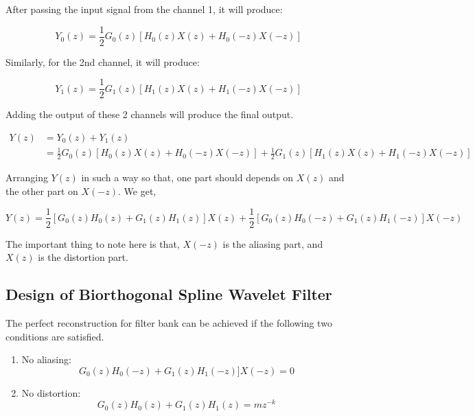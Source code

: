 After passing the input signal from the channel 1, it will produce:

\begin{equation} \label{eqn_wavelet_transform}
{Y_{0}(z) = \frac{1}{2}G_{0}(z)[H_{0}(z)X(z) + H_{0}(-z)X(-z)]}
\end{equation}

Similarly, for the 2nd channel, it will produce:


\begin{equation} \label{eqn_wavelet_transform}
{Y_{1}(z) = \frac{1}{2}G_{1}(z)[H_{1}(z)X(z) + H_{1}(-z)X(-z)]}
\end{equation}

Adding the output of these 2 channels will produce the final output.



\begin{equation} \label{eq1}
	\begin{split}
Y(z)  &= Y_{0}(z) + Y_{1}(z) \\
 &= \frac{1}{2}G_{0}(z)[H_{0}(z)X(z) + H_{0}(-z)X(-z)] + \frac{1}{2}G_{1}(z)[H_{1}(z)X(z) + H_{1}(-z)X(-z)]
	\end{split}
\end{equation}


Arranging $Y(z)$ in such a way so that, one part should depends on $X(z)$ and the other part on $X(-z)$. We get,

\begin{equation} \label{eqn_wavelet_transform}
{Y(z) = \frac{1}{2}[G_{0}(z)H_{0}(z) + G_{1}(z)H_{1}(z)]X(z) + \frac{1}{2}[G_{0}(z)H_{0}(-z) + G_{1}(z)H_{1}(-z)]X(-z)}
\end{equation}

The important thing to note here is that, $X(-z)$ is the aliasing part, and $X(z)$ is the distortion part.


\subsection{Design of Biorthogonal Spline Wavelet Filter}

The perfect reconstruction for filter bank can be achieved if the following two conditions are satisfied.

 \begin{enumerate}
	\item No aliasing: 
	\begin{equation} 
	{G_{0}(z)H_{0}(-z) + G_{1}(z)H_{1}(-z)]X(-z) = 0}
	\end{equation}
	\item No distortion:
	\begin{equation} 
	{G_{0}(z)H_{0}(z) + G_{1}(z)H_{1}(z) = mz^{-k}}
	\end{equation}
\end{enumerate}


